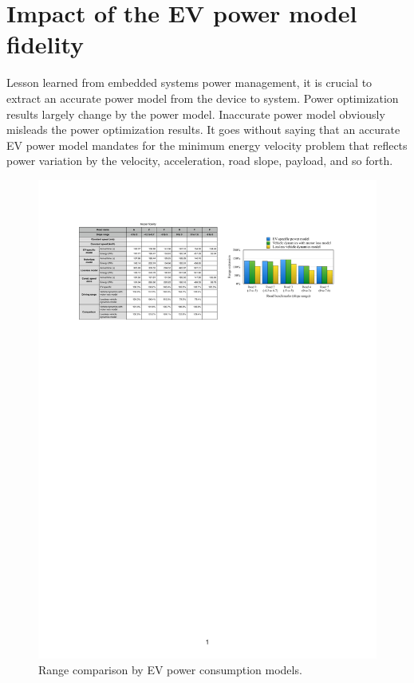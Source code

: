 \documentclass{IEEEtran}
\begin{document}
\section{Impact of the EV power model fidelity} \label{sec:impact_EV_power model}

Lesson learned from embedded systems power management, it is crucial to extract an accurate power model from the device to system. Power optimization results largely change by the power model. Inaccurate power model obviously misleads the power optimization results. It goes without saying that an accurate EV power model mandates for the minimum energy velocity problem that reflects power variation by the velocity, acceleration, road slope, payload, and so forth.

\begin{figure}	 %
\centering
\includegraphics[width=\hsize]{Figures/model_fidelity.pdf}
\caption{Range comparison by EV power consumption models.}
\label{fig:energy_by_model}
\end{figure} 
\end{document}
